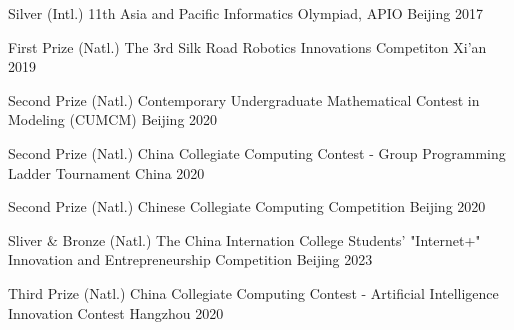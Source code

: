 \begin{cvhonors}

\cvhonor
{Silver} %
{(Intl.) 11th Asia and Pacific Informatics Olympiad, APIO} %
{Beijing} %
{2017} %

\cvhonor
{First Prize} %
{(Natl.) The 3rd Silk Road Robotics Innovations Competiton} %
{Xi'an} %
{2019} %

\cvhonor
{Second Prize} %
{(Natl.) Contemporary Undergraduate Mathematical Contest in Modeling (CUMCM)} %
{Beijing} %
{2020} %

\cvhonor
{Second Prize} %
{(Natl.) China Collegiate Computing Contest - Group Programming Ladder Tournament} %
{China} %
{2020} %


\cvhonor
{Second Prize} %
{(Natl.) Chinese Collegiate Computing Competition} %
{Beijing} %
{2020} %


\cvhonor
{Sliver \& Bronze} %
{(Natl.) The China Internation College Students' "Internet+" Innovation and Entrepreneurship Competition} %
{Beijing} %
{2023} %

\cvhonor
{Third Prize} %
{(Natl.) China Collegiate Computing Contest - Artificial Intelligence Innovation Contest} %
{Hangzhou} %
{2020} %







\end{cvhonors}
